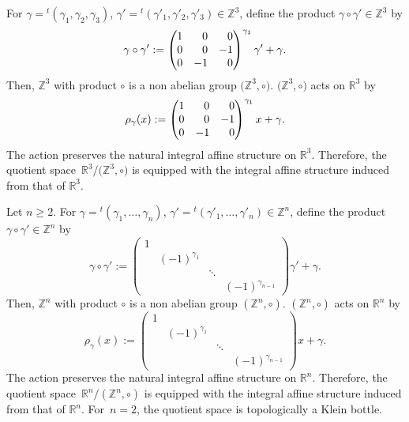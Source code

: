\documentclass[pdftex]{sigma}
\numberwithin{equation}{section}
\newcommand{\R}{\mathbb{R}}
\newcommand{\Z}{\mathbb{Z}}
\begin{document}
\begin{Example}
For $\gamma={}^t(\gamma_1, \gamma_2, \gamma_3)$, $\gamma'={}^t(\gamma'_1, \gamma'_2, \gamma'_3)\in \Z^3$, define the product $\gamma\circ \gamma' \in \Z^3$ by
\[
\gamma\circ \gamma':=
\begin{pmatrix}
1 & \hphantom{-}0 & \hphantom{-}0 \\
0 & \hphantom{-}0 & -1 \\
0 & -1 & \hphantom{-}0
\end{pmatrix}^{\gamma_1}
\gamma'+\gamma.
\]
Then, $\Z^3$ with product $\circ$ is a non abelian group $\bigl(\Z^3,\circ \bigr)$. $\bigl(\Z^3,\circ \bigr)$ acts on $\R^3$ by
\[
\rho_\gamma(x):=
\begin{pmatrix}
1 & \hphantom{-}0 & \hphantom{-}0 \\
0 & \hphantom{-}0 & -1 \\
0 & -1 & \hphantom{-}0
\end{pmatrix}^{\gamma_1}
x+\gamma.
\]
The action preserves the natural integral affine structure on $\R^3$. Therefore, the quotient space~${\R^3/\bigl(\Z^3,\circ \bigr)}$ is equipped with the integral affine structure induced from that of $\R^3$.
\end{Example}

\begin{Example}
Let $n\ge 2$. For $\gamma={}^t(\gamma_1, \ldots, \gamma_n)$, $\gamma'={}^t(\gamma'_1, \ldots, \gamma'_n)\in \Z^n$, define the product~${\gamma\circ \gamma' \in \Z^n}$ by
\[
\gamma\circ \gamma':=
\begin{pmatrix}
1 & & & \\
 & (-1)^{\gamma_1} & & \\
 & & \ddots & \\
 & & & (-1)^{\gamma_{n-1}}
\end{pmatrix}
\gamma'+\gamma.
\]
Then, $\Z^n$ with product $\circ$ is a non abelian group $(\Z^n,\circ )$. $(\Z^n,\circ )$ acts on $\R^n$ by
\[
\rho_\gamma(x):=
\begin{pmatrix}
1 & & & \\
 & (-1)^{\gamma_1} & & \\
 & & \ddots & \\
 & & & (-1)^{\gamma_{n-1}}
\end{pmatrix}
x+\gamma.
\]
The action preserves the natural integral affine structure on $\R^n$. Therefore, the quotient space~${\R^n/(\Z^n,\circ )}$ is equipped with the integral affine structure induced from that of $\R^n$. For~${n\!=\!2}$, the quotient space is topologically a Klein bottle.
\end{Example}
\end{document}
